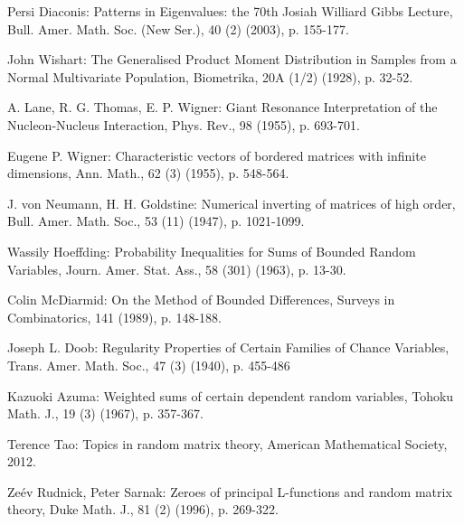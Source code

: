 \documentclass[12pt,a4paper,leqno]{report}
\theoremstyle{plain}
\theoremstyle{definition}
\theoremstyle{remark}
\begin{document}
\begin{thebibliography}{99}

Persi Diaconis: Patterns in Eigenvalues: the 70th Josiah Williard Gibbs Lecture, Bull. Amer. Math. Soc. (New Ser.), 40 (2) (2003), p. 155-177.

John Wishart: The Generalised Product Moment Distribution in Samples from a Normal Multivariate Population, Biometrika, 20A (1/2) (1928), p. 32-52.

A. Lane, R. G. Thomas, E. P. Wigner: Giant Resonance Interpretation of the Nucleon-Nucleus Interaction, Phys. Rev., 98 (1955), p. 693-701. 

Eugene P. Wigner: Characteristic vectors of bordered matrices with infinite dimensions, Ann. Math., 62 (3) (1955), p. 548-564.

J. von Neumann, H. H. Goldstine: Numerical inverting of matrices of high order, Bull. Amer. Math. Soc., 53 (11) (1947), p. 1021-1099.

Wassily Hoeffding: Probability Inequalities for Sums of Bounded Random Variables, Journ. Amer. Stat. Ass., 58 (301) (1963), p. 13-30.

Colin McDiarmid: On the Method of Bounded Differences, Surveys in Combinatorics, 141 (1989), p. 148-188.

Joseph L. Doob: Regularity Properties of Certain Families of Chance Variables, Trans. Amer. Math. Soc., 47 (3) (1940), p. 455-486

Kazuoki Azuma: Weighted sums of certain dependent random variables, Tohoku Math. J., 19 (3) (1967), p. 357-367.

Terence Tao: Topics in random matrix theory, American Mathematical Society, 2012.

Zeév Rudnick, Peter Sarnak: Zeroes of principal L-functions and random matrix theory, Duke Math. J., 81 (2) (1996), p. 269-322.

\end{thebibliography}
\end{document}
